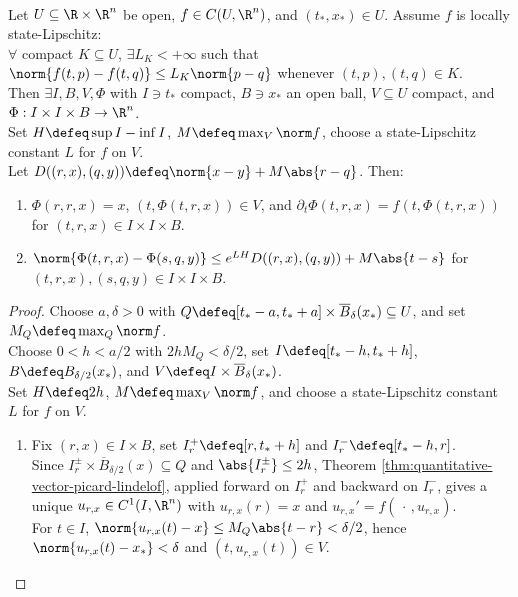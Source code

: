 \begin{theorem} \label{thm:local-lipschitz-dependence-initial-pair} \\
Let $U\subseteq\R\times\R^n$ be open, $f\in C(U,\R^n)$, and $(t_*,x_*)\in U$. Assume $f$ is locally state-Lipschitz:\\
$\forall$ compact $K\subseteq U$, $\exists L_K<+\infty$ such that $\norm{f(t,p)-f(t,q)}\leq L_K\norm{p-q}$ whenever $(t,p),(t,q)\in K$.\\
Then $\exists I,B,V,\Phi$ with $I\ni t_*$ compact, $B\ni x_*$ an open ball, $V\subseteq U$ compact, and $\Phi:I\times I\times B\to\R^n$.\\
Set $H\defeq\sup I-\inf I$, $M\defeq\max_V\norm f$, choose a state-Lipschitz constant $L$ for $f$ on $V$.\\
Let $D((r,x),(q,y))\defeq\norm{x-y}+M\abs{r-q}$. Then:
\begin{enumerate}[label=(\roman*)]
\setlength{\itemsep}{0pt}
\item $\Phi(r,r,x)=x$, $(t,\Phi(t,r,x))\in V$, and $\partial_t\Phi(t,r,x)=f(t,\Phi(t,r,x))$ for $(t,r,x)\in I\times I\times B$.
\item $\norm{\Phi(t,r,x)-\Phi(s,q,y)}\leq e^{LH}D((r,x),(q,y))+M\abs{t-s}$ for $(t,r,x),(s,q,y)\in I\times I\times B$.
\end{enumerate}
\begin{proof}
Choose $a,\delta>0$ with $Q\defeq[t_*-a,t_*+a]\times\overline B_\delta(x_*)\subseteq U$, and set $M_Q\defeq\max_Q\norm f$.\\
Choose $0<h<a/2$ with $2hM_Q<\delta/2$, set $I\defeq[t_*-h,t_*+h]$, $B\defeq B_{\delta/2}(x_*)$, and $V\defeq I\times\overline B_\delta(x_*)$.\\
Set $H\defeq2h$, $M\defeq\max_V\norm f$, and choose a state-Lipschitz constant $L$ for $f$ on $V$.
\begin{enumerate}[label=(\roman*)]
\setlength{\itemsep}{0pt}
\item Fix $(r,x)\in I\times B$, set $I_r^+\defeq[r,t_*+h]$ and $I_r^-\defeq[t_*-h,r]$.\\
Since $I_r^\pm\times\overline B_{\delta/2}(x)\subseteq Q$ and $\abs{I_r^\pm}\leq2h$, Theorem \ref{thm:quantitative-vector-picard-lindelof}, applied forward on $I_r^+$ and backward on $I_r^-$, gives a unique $u_{r,x}\in C^1(I,\R^n)$ with $u_{r,x}(r)=x$ and $u_{r,x}'=f(\,\cdot\,,u_{r,x})$.\\
For $t\in I$, $\norm{u_{r,x}(t)-x}\leq M_Q\abs{t-r}<\delta/2$, hence $\norm{u_{r,x}(t)-x_*}<\delta$ and $(t,u_{r,x}(t))\in V$.\\

\end{enumerate}
\end{proof}
\end{theorem}
